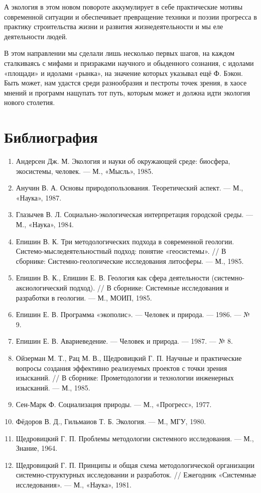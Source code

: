 \documentclass[11pt,a4paper]{article}
\begin{document}
А экология в этом новом повороте аккумулирует в себе практические мотивы
современной ситуации и обеспечивает превращение техники и поэзии прогресса в
практику строительства жизни и развития жизнедеятельности и мы еле
деятельности людей. 

В этом направлении мы сделали лишь несколько первых шагов, на каждом
сталкиваясь с мифами и призраками научного и обыденного сознания, с идолами
«площади» и идолами «рынка», на значение которых указывал ещё Ф. Бэкон. Быть
может, нам удастся среди разнообразия и пестроты точек зрения, в хаосе мнений
и программ нащупать тот путь, которым может и должна идти экология нового
столетия. 

\section{Библиография} 	
\begin{enumerate}
\item Андерсен Дж. М. Экология и науки об окружающей среде: биосфера,
  экосистемы, человек. — М., «Мысль», 1985.
\item Анучин В. А. Основы природопользования. Теоретический аспект. — М.,
  «Наука», 1987.
\item Глазычев В. Л. Социально-экологическая интерпретация городской среды. —
  М., «Наука», 1984.
\item Епишин В. К. Три методологических подхода в современной геологии.
  Системо-мыследеятельностный подход: понятие «геосистемы». // В сборнике:
  Системно-геологические исследования литосферы. — М., 1985.
\item Епишин В. К., Епишин Е. В. Геология как сфера деятельности
  (системно-аксио\-логический подход). // В сборнике: Системные исследования и
  разработки в геологии. — М., МОИП, 1985.
\item Епишин Е. В. Программа «экополис». — Человек и природа. — 1986. — № 9.
\item Епишин Е. В. Авариеведение. — Человек и природа. — 1987. — № 8.
\item Ойзерман М. Т., Рац М. В., Щедровицкий Г. П. Научные и практические
  вопросы создания эффективно реализуемых проектов с точки зрения изысканий.
  // В сборнике: Прометодологии и технологии инженерных изысканий. — М., 1985.
\item Сен-Марк Ф. Социализация природы. — М., «Прогресс», 1977.
\item Фёдоров В. Д., Гильмаиов Т. Б. Экология. — М., МГУ, 1980.
\item Щедровицкий Г. П. Проблемы методологии системного исследования. — М.,
  Знание, 1964.
\item Щедровицкий Г. П. Принципы и общая схема методологической организации
  сис\-темно-структурных исследовании и разработок. // Ежегодник «Системные
  исследования». — М., «Наука», 1981.
\end{enumerate}
\end{document}

